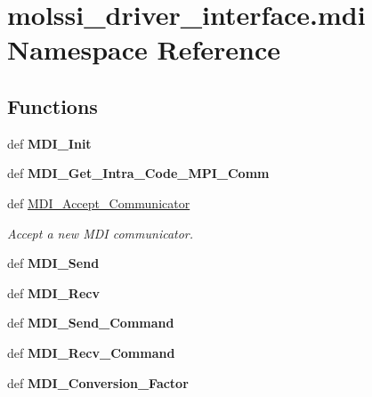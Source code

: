 \hypertarget{namespacemolssi__driver__interface_1_1mdi}{\section{molssi\-\_\-driver\-\_\-interface.\-mdi Namespace Reference}
\label{namespacemolssi__driver__interface_1_1mdi}
}
\subsection*{Functions}
\begin{DoxyCompactItemize}
\item 
\hypertarget{namespacemolssi__driver__interface_1_1mdi_a7fa45893a21039fbc4f4558adff09247}{def {\bfseries M\-D\-I\-\_\-\-Init}}\label{namespacemolssi__driver__interface_1_1mdi_a7fa45893a21039fbc4f4558adff09247}

\item 
\hypertarget{namespacemolssi__driver__interface_1_1mdi_a13123f38cd87a7834a1686f3620b26f5}{def {\bfseries M\-D\-I\-\_\-\-Get\-\_\-\-Intra\-\_\-\-Code\-\_\-\-M\-P\-I\-\_\-\-Comm}}\label{namespacemolssi__driver__interface_1_1mdi_a13123f38cd87a7834a1686f3620b26f5}

\item 
def \hyperlink{namespacemolssi__driver__interface_1_1mdi_a6491914c9c4bb9d3818f53895a735625}{M\-D\-I\-\_\-\-Accept\-\_\-\-Communicator}
\begin{DoxyCompactList}\small\item\em Accept a new M\-D\-I communicator. \end{DoxyCompactList}\item 
\hypertarget{namespacemolssi__driver__interface_1_1mdi_a75666a1612c8fde657f9783f3c42fcaf}{def {\bfseries M\-D\-I\-\_\-\-Send}}\label{namespacemolssi__driver__interface_1_1mdi_a75666a1612c8fde657f9783f3c42fcaf}

\item 
\hypertarget{namespacemolssi__driver__interface_1_1mdi_aad08bf01bdb806196e9a41140325b6ae}{def {\bfseries M\-D\-I\-\_\-\-Recv}}\label{namespacemolssi__driver__interface_1_1mdi_aad08bf01bdb806196e9a41140325b6ae}

\item 
\hypertarget{namespacemolssi__driver__interface_1_1mdi_a09f3c593e5222f1adbec84021f2b3f34}{def {\bfseries M\-D\-I\-\_\-\-Send\-\_\-\-Command}}\label{namespacemolssi__driver__interface_1_1mdi_a09f3c593e5222f1adbec84021f2b3f34}

\item 
\hypertarget{namespacemolssi__driver__interface_1_1mdi_aad3f7850b204cc18683005d43797bebc}{def {\bfseries M\-D\-I\-\_\-\-Recv\-\_\-\-Command}}\label{namespacemolssi__driver__interface_1_1mdi_aad3f7850b204cc18683005d43797bebc}

\item 
\hypertarget{namespacemolssi__driver__interface_1_1mdi_abe90c4e2dfbc92f7c9f6b6e7b9378355}{def {\bfseries M\-D\-I\-\_\-\-Conversion\-\_\-\-Factor}}\label{namespacemolssi__driver__interface_1_1mdi_abe90c4e2dfbc92f7c9f6b6e7b9378355}

\end{DoxyCompactItemize}
